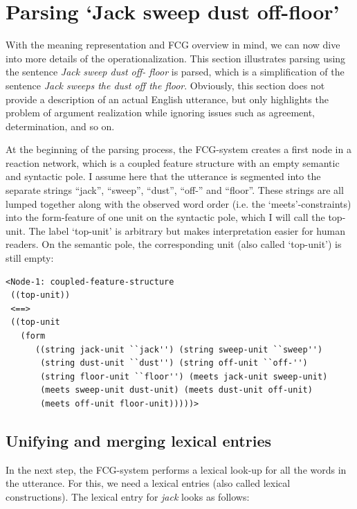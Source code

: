 \section{Parsing `Jack sweep dust off-floor'}

With the meaning representation and FCG overview in mind, we can now dive into more details of the operationalization. This section illustrates parsing using the sentence {\em Jack sweep dust off- floor} is parsed, which is a simplification of the sentence {\em Jack sweeps the dust off the floor}. Obviously, this section does not provide a description of an actual English utterance, but only highlights the problem of argument realization while ignoring issues such as agreement, determination, and so on.

At the beginning of the parsing process, the FCG-system creates a first node in a reaction network, which is a coupled feature structure with an empty semantic and syntactic pole. I assume here that the utterance is segmented into the separate strings ``jack'', ``sweep'', ``dust'', ``off-'' and ``floor''. These strings are all lumped together along with the observed word order (i.e. the `meets'-constraints) into the form-feature of one unit on the syntactic pole, which I will call the top-unit. The label `top-unit' is arbitrary but makes interpretation easier for human readers. On  the semantic pole, the corresponding unit (also called `top-unit') is still empty:

\ea
\begin{lstlisting}
<Node-1: coupled-feature-structure
 ((top-unit))
 <==>
 ((top-unit
   (form 
      ((string jack-unit ``jack'') (string sweep-unit ``sweep'')
       (string dust-unit ``dust'') (string off-unit ``off-'')
       (string floor-unit ``floor'') (meets jack-unit sweep-unit)
       (meets sweep-unit dust-unit) (meets dust-unit off-unit)
       (meets off-unit floor-unit)))))> 
\end{lstlisting}
\z

\subsection{Unifying and merging lexical entries}
\label{s:example-parsing}

In the next step, the FCG-system performs a lexical look-up for all the words in the utterance. For this, we need a lexical entries (also called lexical constructions). The lexical entry for {\em jack} looks as follows: 

